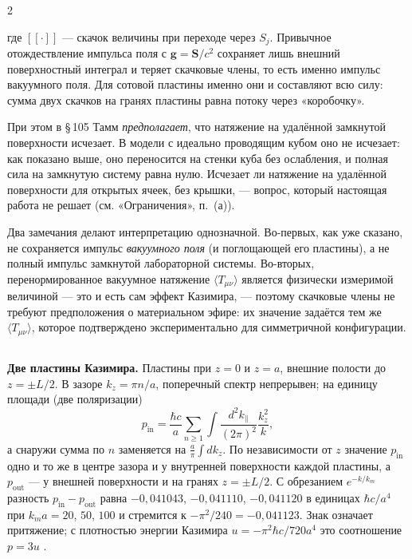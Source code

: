 \documentclass[twoside, 10pt]{article}
\def\myvspacebeforesubsection{-2.0mm}
\def\myvspaceaftersubsection{-2.5mm}
\begin{document}
\begin{multicols}{2}

где \([\![\cdot]\!]\) --- скачок величины при переходе через \(S_j\). Привычное отождествление импульса поля с \(\mathbf{g}=\mathbf{S}/c^2\) сохраняет лишь внешний поверхностный интеграл и теряет скачковые члены, то есть именно импульс вакуумного поля. Для сотовой пластины именно они и составляют всю силу: сумма двух
скачков на гранях пластины равна потоку через «коробочку».

При этом в \S\,105 Тамм \emph{предполагает}, что натяжение на удалённой замкнутой поверхности исчезает. В модели с идеально проводящим кубом оно не исчезает: как показано выше, оно переносится на стенки куба без ослабления, и полная сила на замкнутую систему равна нулю. Исчезает ли натяжение на удалённой поверхности для открытых ячеек, без крышки, --- вопрос, который настоящая работа не решает (см. «Ограничения», п.~(а)).

Два замечания делают интерпретацию однозначной. Во-первых, как уже сказано, не сохраняется
импульс \emph{вакуумного поля} (и поглощающей его пластины), а не полный импульс замкнутой лабораторной
системы. Во-вторых, перенормированное вакуумное натяжение \(\langle T_{\mu\nu}\rangle\) является
физически измеримой величиной --- это и есть сам эффект Казимира, --- поэтому скачковые члены
не требуют предположения о материальном эфире: их значение задаётся тем же
\(\langle T_{\mu\nu}\rangle\), которое подтверждено экспериментально для симметричной
конфигурации.

\vspace{\myvspacebeforesubsection}
\subsection*{}
\vspace{\myvspaceaftersubsection}


\textbf{Две пластины Казимира.} Пластины при \(z=0\) и \(z=a\), внешние полости до \(z=\pm L/2\).
В зазоре \(k_z=\pi n/a\), поперечный спектр непрерывен; на единицу площади (две поляризации)
\[
p_{\text{in}}=\frac{\hbar c}{a}\sum_{n\ge1}\int\frac{d^2k_\parallel}{(2\pi)^2}\frac{k_z^2}{k},
\]
а снаружи сумма по \(n\) заменяется на \(\frac a\pi\int dk_z\). По независимости от \(z\)
значение \(p_{\text{in}}\) одно и то же в центре зазора и у внутренней поверхности каждой
пластины, а \(p_{\text{out}}\) --- у внешней поверхности и на гранях \(z=\pm L/2\). С обрезанием
\(e^{-k/k_m}\) разность \(p_{\text{in}}-p_{\text{out}}\) равна \(-0{,}041043\), \(-0{,}041110\),
\(-0{,}041120\) в единицах \(\hbar c/a^4\) при \(k_ma=20\), \(50\), \(100\) и стремится к
\(-\pi^2/240=-0{,}041123\). Знак означает притяжение; с плотностью энергии Казимира
\(u=-\pi^2\hbar c/720a^4\) это соотношение \(p=3u\) \cite{BrownMaclay1969}.


\end{multicols}
\end{document}
